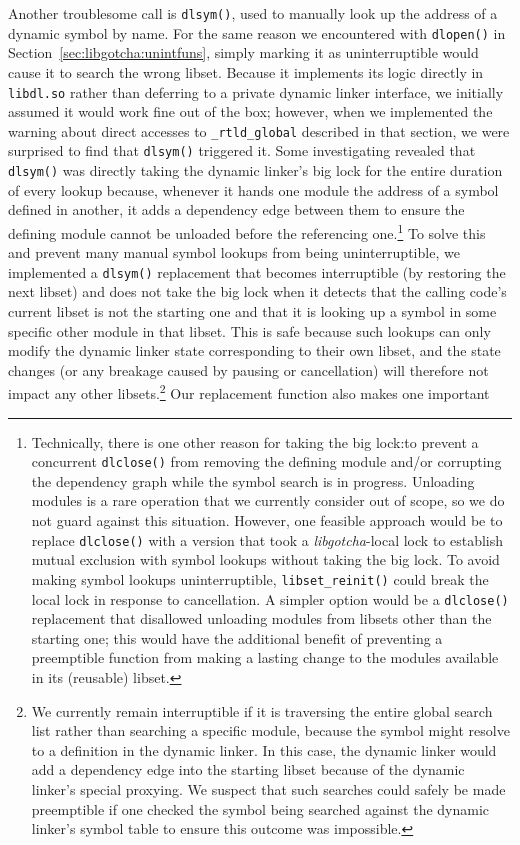 Another troublesome call is \texttt{dlsym()}, used to manually look up the address of
a dynamic symbol by name.  For the same reason we encountered with \texttt{dlopen()}
in Section~\ref{sec:libgotcha:unintfuns}, simply marking it as uninterruptible would
cause it to search the wrong libset.  Because it implements its logic directly in
\texttt{libdl.so} rather than deferring to a private dynamic linker interface, we
initially assumed it would work fine out of the box; however, when we implemented the
warning about direct accesses to \texttt{\_rtld\_global} described in that section,
we were surprised to find that \texttt{dlsym()} triggered it.  Some investigating
revealed that \texttt{dlsym()} was directly taking the dynamic linker's big lock for 
the entire duration of every lookup because, whenever it hands one module the address
of a symbol defined in another, it adds a dependency edge between them to ensure the
defining module cannot be unloaded before the referencing one.\footnote{Technically,
there is one other reason for taking the big lock:\@ to prevent a concurrent
\texttt{dlclose()} from removing the defining module and/or corrupting the dependency
graph while the symbol search is in progress.  Unloading modules is a rare operation
that we currently consider out of scope, so we do not guard against this situation.
However, one feasible approach would be to replace \texttt{dlclose()} with a version
that took a \textit{libgotcha}-local lock to establish mutual exclusion with symbol
lookups without taking the big lock.  To avoid making symbol lookups uninterruptible,
\texttt{libset\_reinit()} could break the local lock in response to cancellation.  A
simpler option would be a \texttt{dlclose()} replacement that disallowed unloading
modules from libsets other than the starting one; this would have the additional
benefit of preventing a preemptible function from making a lasting change to the
modules available in its (reusable) libset.}  To solve this and prevent many manual
symbol lookups from being uninterruptible, we implemented a \texttt{dlsym()}
replacement that becomes interruptible (by restoring the next libset) and does not
take the big lock when it detects that the calling code's current libset is not the
starting one and that it is looking up a symbol in some specific other module in that
libset.  This is safe because such lookups can only modify the dynamic linker state
corresponding to their own libset, and the state changes (or any breakage caused by
pausing or cancellation) will therefore not impact any other libsets.\footnote{We
currently remain interruptible if it is traversing the entire global search list
rather than searching a specific module, because the symbol might resolve to a
definition in the dynamic linker.  In this case, the dynamic linker would add a
dependency edge into the starting libset because of the dynamic linker's special
proxying.  We suspect that such searches could safely be made preemptible if one
checked the symbol being searched against the dynamic linker's symbol table to ensure
this outcome was impossible.}  Our replacement function also makes one important
